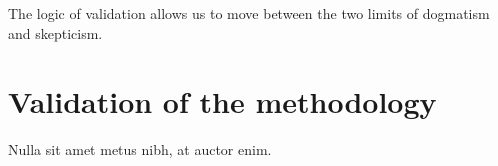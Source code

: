 

\begin{savequote}[50mm]
The logic of validation allows us to move between the two limits of dogmatism and skepticism. 
\end{savequote}


\chapter{Validation of the methodology}
\label{cha:Validation of the methodology}

\ifpdf
    \graphicspath{{4_experiments_and_results/figures/PNG/}{4_experiments_and_results/figures/PDF/}{4_experiments_and_results/figures/}}
\else
    \graphicspath{{4_experiments_and_results/figures/EPS/}{4_experiments_and_results/figures/}}
\fi



\cite{turing1950computing}

Nulla sit amet metus nibh, at auctor enim.







